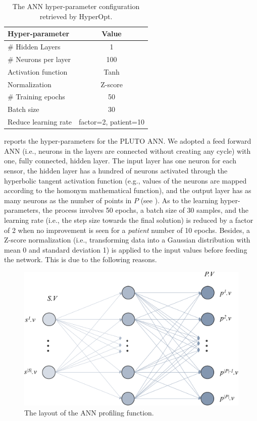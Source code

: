 \begin{table}[t]
\centering
\caption{The ANN hyper-parameter configuration retrieved by HyperOpt.}
\begin{tabular}{lc}
\hline
Hyper-parameter & Value \\ \hline
\# Hidden Layers & 1 \\
\# Neurons per layer & 100 \\
Activation function & Tanh \\
Normalization & Z-score \\
\# Training epochs & 50 \\
Batch size & 30 \\
Reduce learning rate & factor=2, patient=10 \\ \hline
\end{tabular}
\label{tab:ann_configuration}
\end{table}

 reports the hyper-parameters for the PLUTO ANN.
We adopted a feed forward ANN (i.e., neurons in the layers are connected without creating any cycle) with one, fully connected, hidden layer.
The input layer has one neuron for each sensor, the hidden layer has a hundred of neurons activated through the hyperbolic tangent activation function (e.g., values of the neurons are mapped according to the homonym mathematical function), and the output layer has as many neurons as the number of points in $P$ (see ).
As to the learning hyper-parameters, the process involves 50 epochs, a batch size of 30 samples, and the learning rate (i.e., the step size towards the final solution) is reduced by a factor of 2 when no improvement is seen for a \textit{patient} number of 10 epochs.
Besides, a Z-score normalization (i.e., transforming data into a Gaussian distribution with mean 0 and standard deviation 1) is applied to the input values before feeding the network. This is due to the following reasons.
\begin{figure}[t]
\centering
\includegraphics[scale=.4]{chapters/physics-aware/pluto/img/ANN.pdf}
\caption{The layout of the ANN profiling function.}
\label{pluto-fig:ANN}
\end{figure}

